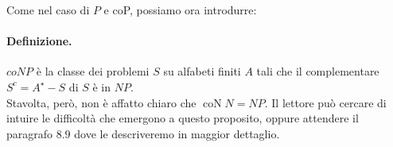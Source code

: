 Come nel caso di $P$ e coP, possiamo ora introdurre:

\paragraph{Definizione.} $coNP$ è la classe dei problemi $S$ su
alfabeti finiti $A$ tali che il complementare $S^c=A^{\star}-S$ di $S$ è in $N
    P$.\\

Stavolta, però, non è affatto chiaro che $\operatorname{coN} N=N P$. Il lettore
può cercare di intuire le difficoltà che emergono a questo proposito, oppure
attendere il paragrafo $8.9$ dove le descriveremo in maggior dettaglio.
